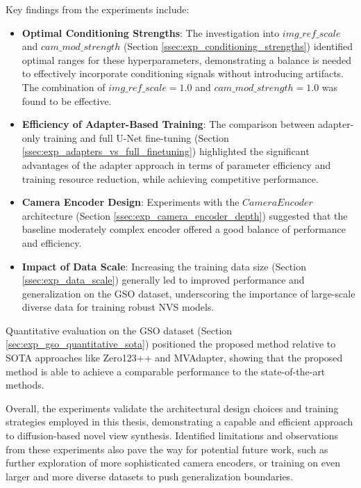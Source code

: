 Key findings from the experiments include:
\begin{itemize}
  \item \textbf{Optimal Conditioning Strengths}: The investigation into $img\_ref\_scale$ and $cam\_mod\_strength$ (Section \ref{ssec:exp_conditioning_strengths}) identified optimal ranges for these hyperparameters, demonstrating a balance is needed to effectively incorporate conditioning signals without introducing artifacts. The combination of $img\_ref\_scale=1.0$ and $cam\_mod\_strength=1.0$ was found to be effective.
  \item \textbf{Efficiency of Adapter-Based Training}: The comparison between adapter-only training and full U-Net fine-tuning (Section \ref{ssec:exp_adapters_vs_full_finetuning}) highlighted the significant advantages of the adapter approach in terms of parameter efficiency and training resource reduction, while achieving competitive performance.
  \item \textbf{Camera Encoder Design}: Experiments with the $CameraEncoder$ architecture (Section \ref{ssec:exp_camera_encoder_depth}) suggested that the baseline moderately complex encoder offered a good balance of performance and efficiency.
  \item \textbf{Impact of Data Scale}: Increasing the training data size (Section \ref{ssec:exp_data_scale}) generally led to improved performance and generalization on the GSO dataset, underscoring the importance of large-scale diverse data for training robust NVS models.
\end{itemize}

Quantitative evaluation on the GSO dataset (Section \ref{sec:exp_gso_quantitative_sota}) positioned the proposed method relative to SOTA approaches like Zero123++ and MVAdapter, showing that the proposed method is able to achieve a comparable performance to the state-of-the-art methods.

Overall, the experiments validate the architectural design choices and training strategies employed in this thesis, demonstrating a capable and efficient approach to diffusion-based novel view synthesis. Identified limitations and observations from these experiments also pave the way for potential future work, such as further exploration of more sophisticated camera encoders, or training on even larger and more diverse datasets to push generalization boundaries.